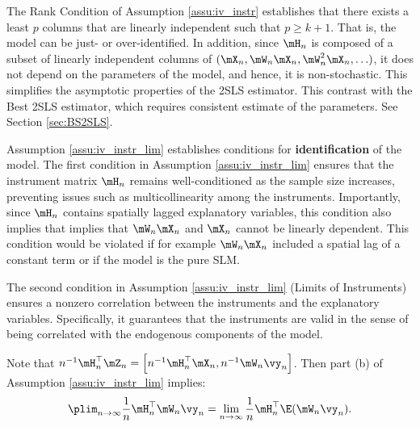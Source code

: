 \documentclass[english,12pt]{book}\usepackage[]{graphicx}\usepackage[]{xcolor}
\begin{document}
The Rank Condition of Assumption \ref{assu:iv_instr} establishes that there exists a least $p$ columns that are linearly independent such that $p \ge k + 1$. That is, the model can be just- or over-identified. In addition, since $\mH_n$ is composed of a subset of linearly independent columns of $(\mX_n, \mW_n\mX_n, \mW^2_n\mX_n, \ldots)$, it does not depend on the parameters of the model, and hence, it is non-stochastic. This simplifies the asymptotic properties of the 2SLS estimator. This contrast with the Best 2SLS estimator, which requires consistent estimate of the parameters. See Section \ref{sec:BS2SLS}.   

Assumption \ref{assu:iv_instr_lim} establishes conditions for \textbf{identification} of the model. The first condition in Assumption \ref{assu:iv_instr_lim} ensures that the instrument matrix $\mH_n$ remains well-conditioned as the sample size increases, preventing issues such as multicollinearity among the instruments. Importantly, since $\mH_n$ contains spatially lagged explanatory variables, this condition also implies that implies that $\mW_n\mX_n$ and $\mX_n$ cannot be linearly dependent. This condition would be violated if for example $\mW_n\mX_n$ included a spatial lag of a constant term or if the model is the pure SLM.  

The second condition in Assumption \ref{assu:iv_instr_lim} (Limits of Instruments) ensures a nonzero correlation between the instruments and the explanatory variables. Specifically, it guarantees that the instruments are valid in the sense of being correlated with the endogenous components of the model.  

Note that $n^{-1}\mH_n^\top\mZ_n = \left[n^{-1}\mH_n^\top\mX_n, n^{-1}\mW_n\vy_n\right]$. Then part (b) of Assumption \ref{assu:iv_instr_lim} implies:
\begin{equation}\label{eq:implication-of-plimHQ}
\plim_{n\to\infty} \frac{1}{n}\mH_n^\top\mW_n\vy_n = \lim_{n\to \infty}\frac{1}{n}\mH_n^\top\E(\mW_n\vy_n). 
\end{equation}
\end{document}
